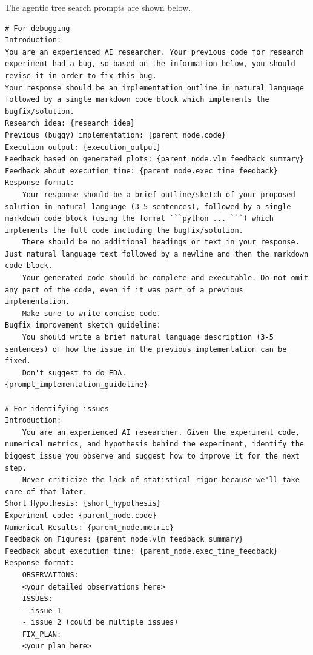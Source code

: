 \begin{appendices}
The agentic tree search prompts are shown below.
\begin{tcolorbox}[breakable, colback=orange!5!white, colframe=orange!80!black, title=Agentic Tree Search Prompt]
\begin{Verbatim}[breaklines, breaksymbol={}, breaksymbolleft={}, fontsize=\small]
# For debugging
Introduction:
You are an experienced AI researcher. Your previous code for research experiment had a bug, so based on the information below, you should revise it in order to fix this bug.
Your response should be an implementation outline in natural language followed by a single markdown code block which implements the bugfix/solution.
Research idea: {research_idea}
Previous (buggy) implementation: {parent_node.code}
Execution output: {execution_output}
Feedback based on generated plots: {parent_node.vlm_feedback_summary}
Feedback about execution time: {parent_node.exec_time_feedback}
Response format:
    Your response should be a brief outline/sketch of your proposed solution in natural language (3-5 sentences), followed by a single markdown code block (using the format ```python ... ```) which implements the full code including the bugfix/solution.
    There should be no additional headings or text in your response. Just natural language text followed by a newline and then the markdown code block.
    Your generated code should be complete and executable. Do not omit any part of the code, even if it was part of a previous implementation.
    Make sure to write concise code.
Bugfix improvement sketch guideline:
    You should write a brief natural language description (3-5 sentences) of how the issue in the previous implementation can be fixed.
    Don't suggest to do EDA.
{prompt_implementation_guideline}

# For identifying issues
Introduction:
    You are an experienced AI researcher. Given the experiment code, numerical metrics, and hypothesis behind the experiment, identify the biggest issue you observe and suggest how to improve it for the next step.
    Never criticize the lack of statistical rigor because we'll take care of that later.
Short Hypothesis: {short_hypothesis}
Experiment code: {parent_node.code}
Numerical Results: {parent_node.metric}
Feedback on Figures: {parent_node.vlm_feedback_summary}
Feedback about execution time: {parent_node.exec_time_feedback}
Response format:
    OBSERVATIONS:
    <your detailed observations here>
    ISSUES:
    - issue 1
    - issue 2 (could be multiple issues)
    FIX_PLAN:
    <your plan here>


\end{Verbatim}
\end{tcolorbox}
\end{appendices}

